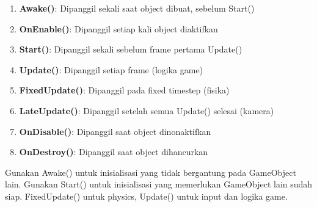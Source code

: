\begin{enumerate}
\item \textbf{Awake()}: Dipanggil sekali saat object dibuat, sebelum Start()
\item \textbf{OnEnable()}: Dipanggil setiap kali object diaktifkan
\item \textbf{Start()}: Dipanggil sekali sebelum frame pertama Update()
\item \textbf{Update()}: Dipanggil setiap frame (logika game)
\item \textbf{FixedUpdate()}: Dipanggil pada fixed timestep (fisika)
\item \textbf{LateUpdate()}: Dipanggil setelah semua Update() selesai (kamera)
\item \textbf{OnDisable()}: Dipanggil saat object dinonaktifkan
\item \textbf{OnDestroy()}: Dipanggil saat object dihancurkan
\end{enumerate}

\begin{catatan}
Gunakan Awake() untuk inisialisasi yang tidak bergantung pada GameObject lain. Gunakan Start() untuk inisialisasi yang memerlukan GameObject lain sudah siap. FixedUpdate() untuk physics, Update() untuk input dan logika game.
\end{catatan}
